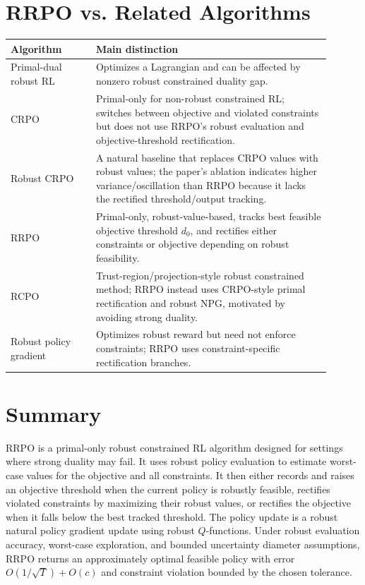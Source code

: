 \documentclass[11pt]{article}
\newcommand{\1}{\mathbf 1}
\begin{document}
\section{RRPO vs. Related Algorithms}
\begin{center}
\begin{tabular}{p{0.24\linewidth}p{0.66\linewidth}}
\toprule
Algorithm & Main distinction \\
\midrule
Primal-dual robust RL & Optimizes a Lagrangian and can be affected by nonzero robust constrained duality gap. \\
CRPO & Primal-only for non-robust constrained RL; switches between objective and violated constraints but does not use RRPO's robust evaluation and objective-threshold rectification. \\
Robust CRPO & A natural baseline that replaces CRPO values with robust values; the paper's ablation indicates higher variance/oscillation than RRPO because it lacks the rectified threshold/output tracking. \\
RRPO & Primal-only, robust-value-based, tracks best feasible objective threshold $d_0$, and rectifies either constraints or objective depending on robust feasibility. \\
RCPO & Trust-region/projection-style robust constrained method; RRPO instead uses CRPO-style primal rectification and robust NPG, motivated by avoiding strong duality. \\
Robust policy gradient & Optimizes robust reward but need not enforce constraints; RRPO uses constraint-specific rectification branches. \\
\bottomrule
\end{tabular}
\end{center}

\section{Summary}
RRPO is a primal-only robust constrained RL algorithm designed for settings where strong duality may fail.  It uses robust policy evaluation to estimate worst-case values for the objective and all constraints.  It then either records and raises an objective threshold when the current policy is robustly feasible, rectifies violated constraints by maximizing their robust values, or rectifies the objective when it falls below the best tracked threshold.  The policy update is a robust natural policy gradient update using robust $Q$-functions.  Under robust evaluation accuracy, worst-case exploration, and bounded uncertainty diameter assumptions, RRPO returns an approximately optimal feasible policy with error $O(1/\sqrt T)+O(c)$ and constraint violation bounded by the chosen tolerance.
\end{document}
